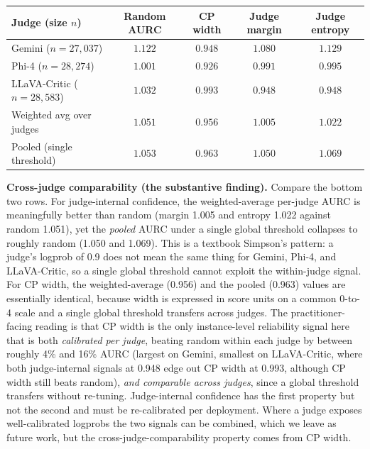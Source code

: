 \documentclass[11pt]{article}
\begin{document}
\begin{center}
\small
\begin{tabular}{lcccc}
\toprule
\textbf{Judge} (size $n$) & \textbf{Random AURC} & \textbf{CP width} & \textbf{Judge margin} & \textbf{Judge entropy} \\
\midrule
Gemini ($n=27{,}037$)       & $1.122$ & $\mathbf{0.948}$ & $1.080$ & $1.129$ \\
Phi-4  ($n=28{,}274$)        & $1.001$ & $\mathbf{0.926}$ & $0.991$ & $0.995$ \\
LLaVA-Critic ($n=28{,}583$) & $1.032$ & $0.993$ & $\mathbf{0.948}$ & $0.948$ \\
\midrule
Weighted avg over judges & $1.051$ & $0.956$ & $1.005$ & $1.022$ \\
Pooled (single threshold) & $1.053$ & $0.963$ & $1.050$ & $1.069$ \\
\bottomrule
\end{tabular}
\end{center}

\textbf{Cross-judge comparability (the substantive finding).} Compare the bottom two rows. For judge-internal confidence, the weighted-average per-judge AURC is meaningfully better than random (margin 1.005 and entropy 1.022 against random 1.051), yet the \emph{pooled} AURC under a single global threshold collapses to roughly random (1.050 and 1.069). This is a textbook Simpson's pattern: a judge's logprob of 0.9 does not mean the same thing for Gemini, Phi-4, and LLaVA-Critic, so a single global threshold cannot exploit the within-judge signal. For CP width, the weighted-average (0.956) and the pooled (0.963) values are essentially identical, because width is expressed in score units on a common 0-to-4 scale and a single global threshold transfers across judges. The practitioner-facing reading is that CP width is the only instance-level reliability signal here that is both \emph{calibrated per judge}, beating random within each judge by between roughly 4\% and 16\% AURC (largest on Gemini, smallest on LLaVA-Critic, where both judge-internal signals at 0.948 edge out CP width at 0.993, although CP width still beats random), \emph{and comparable across judges}, since a global threshold transfers without re-tuning. Judge-internal confidence has the first property but not the second and must be re-calibrated per deployment. Where a judge exposes well-calibrated logprobs the two signals can be combined, which we leave as future work, but the cross-judge-comparability property comes from CP width.
\end{document}
